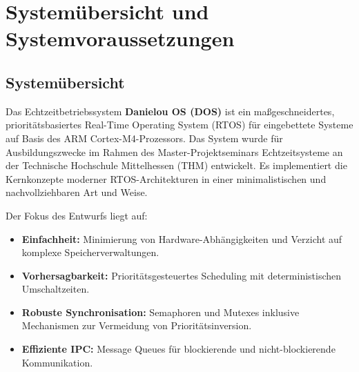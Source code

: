 \chapter{Systemübersicht und Systemvoraussetzungen}
\label{ch:einfuehrung}

\section{Systemübersicht}
Das Echtzeitbetriebssystem \textbf{Danielou OS (DOS)} ist ein maßgeschneidertes, prioritätsbasiertes Real-Time Operating System (RTOS) für eingebettete Systeme auf Basis des ARM Cortex-M4-Prozessors. Das System wurde für Ausbildungszwecke im Rahmen des Master-Projektseminars Echtzeitsysteme an der Technische Hochschule Mittelhessen (THM) entwickelt. Es implementiert die Kernkonzepte moderner RTOS-Architekturen in einer minimalistischen und nachvollziehbaren Art und Weise.

Der Fokus des Entwurfs liegt auf:
\begin{itemize}
    \item \textbf{Einfachheit:} Minimierung von Hardware-Abhängigkeiten und Verzicht auf komplexe Speicherverwaltungen.
    \item \textbf{Vorhersagbarkeit:} Prioritätsgesteuertes Scheduling mit deterministischen Umschaltzeiten.
    \item \textbf{Robuste Synchronisation:} Semaphoren und Mutexes inklusive Mechanismen zur Vermeidung von Prioritätsinversion.
    \item \textbf{Effiziente IPC:} Message Queues für blockierende und nicht-blockierende Kommunikation.
\end{itemize}

